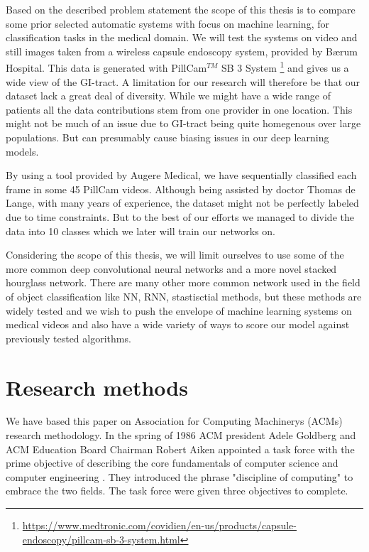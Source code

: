 \documentclass[thesis.tex]{subfiles}
\begin{document}
Based on the described problem statement the scope of this thesis is to compare some prior selected automatic systems with focus on machine learning, for classification tasks in the medical domain. We will test the systems on video and still images taken from a wireless capsule endoscopy system, provided by Bærum Hospital. This data is generated with PillCam$^{TM}$ SB 3 System \footnote{\url{https://www.medtronic.com/covidien/en-us/products/capsule-endoscopy/pillcam-sb-3-system.html}} and gives us a wide view of the GI-tract. A limitation for our research will therefore be that our dataset lack a great deal of diversity. While we might have a wide range of patients all the data contributions stem from one provider in one location. This might not be much of an issue due to GI-tract being quite homegenous over large populations. But can presumably cause biasing issues in our deep learning models. %

By using a tool provided by Augere Medical, we have sequentially classified each frame in some 45 PillCam videos. Although being assisted by doctor Thomas de Lange, with many years of experience, the dataset might not be perfectly labeled due to time constraints. But to the best of our efforts we managed to divide the data into 10 classes which we later will train our networks on.

Considering the scope of this thesis, we will limit ourselves to use some of the more common deep convolutional neural networks and a more novel stacked hourglass network. There are many other more common network used in the field of object classification like NN, RNN, stastisctial methods, but these methods are widely tested and we wish to push the envelope of machine learning systems on medical videos and also have a wide variety of ways to score our model against previously tested algorithms.


\section{Research methods} \label{sec:research_methods}

We have based this paper on Association for Computing Machinerys (ACMs) research
methodology. In the spring of 1986 ACM president Adele Goldberg and ACM Education Board Chairman Robert Aiken appointed a task force with the prime objective of describing the core fundamentals of computer science and computer engineering \cite{ComputingDiscipline89}. They introduced the phrase "discipline of computing" to embrace the two fields. The task force were given three objectives to complete.
\end{document}

